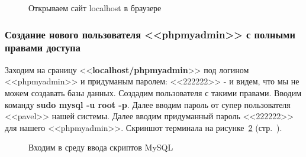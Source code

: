 \begin{figure}[p]
    \caption{Открываем сайт localhost в браузере}
    \label{fig:sudo-apt-install-apache2-step-7}
\end{figure}

\newpage


\subsubsection*{Создание нового пользователя <<phpmyadmin>> с полными правами доступа}

Заходим на сраницу <<\textbf{localhost/phpmyadmin}>> под логином <<phpmyadmin>> и придуманым паролем: <<222222>> - и видем, что мы не можем создавать базы данных. Создадим пользователя с такими правами. Вводим команду \textbf{sudo mysql -u root -p}. Далее вводим пароль от супер пользователя <<pavel>> нашей системы. Далее вводим придуманный пароль <<222222>> для нашего <<phpmyadmin>>.
Скриншот терминала на рисунке~\ref{fig:make-phpmyadmin-superuser-step-0} (стр.~\pageref{fig:make-phpmyadmin-superuser-step-0}).

\begin{figure}[p]
    \caption{Входим в среду ввода скриптов MySQL}
    \label{fig:make-phpmyadmin-superuser-step-0}
\end{figure}

